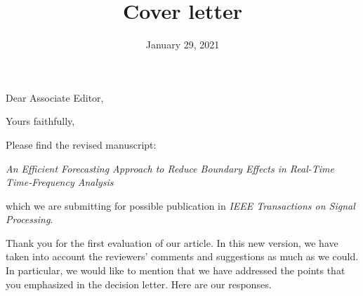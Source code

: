 \documentclass[11pt,letterpaper,roman]{moderncv}
\title{Cover letter}
\begin{document}
\date{January 29, 2021}
\opening{Dear Associate Editor,}
\closing{Yours faithfully,}

\makelettertitle
\justify
 
Please find the revised manuscript:
\begin{center}
\emph{An Efficient Forecasting Approach to Reduce Boundary Effects in Real-Time Time-Frequency Analysis}
\end{center}
which we are submitting for possible publication in \textit{IEEE Transactions on Signal Processing}.

Thank you for the first evaluation of our article. In this new version, we have taken into account the reviewers' comments and suggestions as much as we could. In particular, we would like to mention that we have addressed the points that you emphasized in the decision letter. Here are our responses.
\end{document}
